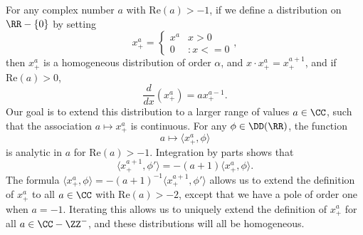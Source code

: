 \begin{example}
  For any complex number $a$ with $\text{Re}(a) > -1$, if we define a distribution on $\RR - \{ 0 \}$ by setting
  \[ x^a_+ = \begin{cases} x^a & x > 0 \\ 0 &: x <= 0 \end{cases}, \]
  then $x^a_+$ is a homogeneous distribution of order $\alpha$, and $x \cdot x^a_+ = x^{a+1}_+$, and if $\text{Re}(a) > 0$,
  \[ \frac{d}{dx} \left( x^a_+ \right) = a x^{a-1}_+. \]
  Our goal is to extend this distribution to a larger range of values $a \in \CC$, such that the association $a \mapsto x^a_+$ is continuous. For any $\phi \in \DD(\RR)$, the function
  \[ a \mapsto \langle x^a_+, \phi \rangle \]
  is analytic in $a$ for $\text{Re}(a) > -1$. Integration by parts shows that
  \[ \langle x^{a+1}_+, \phi' \rangle = - (a+1) \langle x^a_+, \phi \rangle. \]
  The formula $\langle x^a_+, \phi \rangle = -(a+1)^{-1} \langle x^{a+1}_+, \phi' \rangle$ allows us to extend the definition of $x^a_+$ to all $a \in \CC$ with $\text{Re}(a) > -2$, except that we have a pole of order one when $a = -1$. Iterating this allows us to uniquely extend the definition of $x^a_+$ for all $a \in \CC - \ZZ^-$, and these distributions will all be homogeneous.


\end{example}
